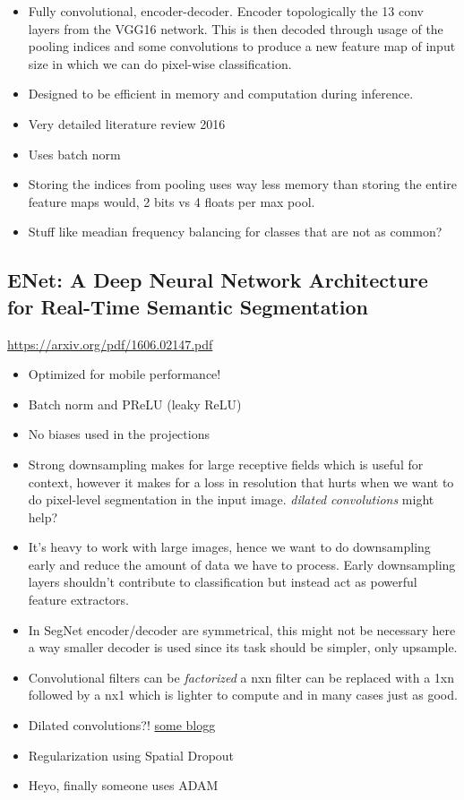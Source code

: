\documentclass[11pt]{article}
\begin{document}
\begin{itemize}
\item Fully convolutional, encoder-decoder. Encoder topologically the 13 conv layers from the VGG16 network. This is then decoded through usage of the pooling indices and some convolutions to produce a new feature map of input size in which we can do pixel-wise classification.
\item Designed to be efficient in memory and computation during inference.
\item Very detailed literature review 2016
\item Uses batch norm
\item Storing the indices from pooling uses way less memory than storing the entire feature maps would, 2 bits vs 4 floats per max pool.
\item Stuff like meadian frequency balancing for classes that are not as common?
\end{itemize}

\subsection{ENet: A Deep Neural Network Architecture for Real-Time Semantic Segmentation}
\label{sec:org5f477db}
\url{https://arxiv.org/pdf/1606.02147.pdf}

\begin{itemize}
\item Optimized for mobile performance!
\item Batch norm and PReLU (leaky ReLU)
\item No biases used in the projections
\item Strong downsampling makes for large receptive fields which is useful for context, however it makes for a loss in resolution that hurts when we want to do pixel-level segmentation in the input image. \emph{dilated convolutions} might help?
\item It's heavy to work with large images, hence we want to do downsampling early and reduce the amount of data we have to process. Early downsampling layers shouldn't contribute to classification but instead act as powerful feature extractors.
\item In SegNet encoder/decoder are symmetrical, this might not be necessary here a way smaller decoder is used since its task should be simpler, only upsample.
\item Convolutional filters can be \emph{factorized} a nxn filter can be replaced with a 1xn followed by a nx1 which is lighter to compute and in many cases just as good.
\item Dilated convolutions?! \href{http://www.inference.vc/dilated-convolutions-and-kronecker-factorisation/}{some blogg}
\item Regularization using Spatial Dropout
\item Heyo, finally someone uses ADAM
\end{itemize}
\end{document}

